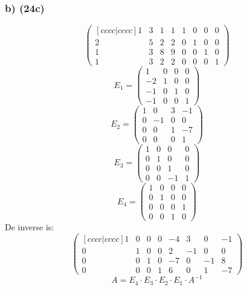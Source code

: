 \documentclass[lineaire_algebra_oplossingen.tex]{subfiles}
\begin{document}
\subsubsection*{b) (24c)}
\[
\begin{pmatrix}[cccc|cccc]
1 & 3 & 1 & 1 & 1 & 0 & 0 & 0\\
2 & 5 & 2 & 2 & 0 & 1 & 0 & 0\\
1 & 3 & 8 & 9 & 0 & 0 & 1 & 0\\
1 & 3 & 2 & 2 & 0 & 0 & 0 & 1
\end{pmatrix}
\]
\[ E_1 =
\begin{pmatrix}
1 & 0 & 0 & 0\\
-2 & 1 & 0 & 0\\
-1 & 0 & 1 & 0\\
-1 & 0 & 0 & 1
\end{pmatrix}
\]
\[ E_2 =
\begin{pmatrix}
1 & 0 & 3 & -1\\
0 & -1 & 0 & 0\\
0 & 0 & 1 & -7\\
0 & 0 & 0 & 1
\end{pmatrix}
\]
\[ E_3 =
\begin{pmatrix}
1 & 0 & 0 & 0\\
0 & 1 & 0 & 0\\
0 & 0 & 1 & 0\\
0 & 0 & -1 & 1
\end{pmatrix}
\]
\[ E_4 =
\begin{pmatrix}
1 & 0 & 0 & 0\\
0 & 1 & 0 & 0\\
0 & 0 & 0 & 1\\
0 & 0 & 1 & 0
\end{pmatrix}
\]
De inverse is:
\[
\begin{pmatrix}[cccc|cccc]
1 & 0 & 0 & 0 & -4 & 3 & 0 & -1\\
0 & 1 & 0 & 0 & 2 & -1 & 0 & 0\\
0 & 0 & 1 & 0 & -7 & 0 & -1 & 8\\
0 & 0 & 0 & 1 & 6 & 0 & 1 & -7
\end{pmatrix}
\]
\[ A = E_4 \cdot E_3 \cdot E_2 \cdot E_1 \cdot A^{-1} \]
\end{document}
